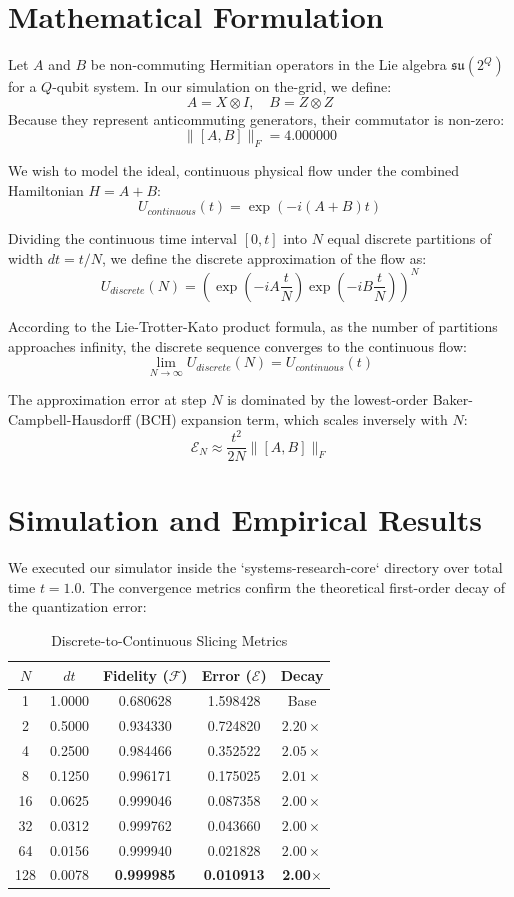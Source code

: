 \documentclass[11pt,twocolumn]{article}
\begin{document}
\section{Mathematical Formulation}
Let $A$ and $B$ be non-commuting Hermitian operators in the Lie algebra $\mathfrak{su}(2^Q)$ for a $Q$-qubit system. In our simulation on the-grid, we define:
$$A = X \otimes I, \quad B = Z \otimes Z$$
Because they represent anticommuting generators, their commutator is non-zero:
$$\|[A, B]\|_F = 4.000000$$

We wish to model the ideal, continuous physical flow under the combined Hamiltonian $H = A + B$:
$$U_{continuous}(t) = \exp\left( -i (A + B) t \right)$$

Dividing the continuous time interval $[0, t]$ into $N$ equal discrete partitions of width $dt = t/N$, we define the discrete approximation of the flow as:
$$U_{discrete}(N) = \left( \exp\left(-i A \frac{t}{N}\right) \exp\left(-i B \frac{t}{N}\right) \right)^N$$

According to the Lie-Trotter-Kato product formula, as the number of partitions approaches infinity, the discrete sequence converges to the continuous flow:
$$\lim_{N \to \infty} U_{discrete}(N) = U_{continuous}(t)$$

The approximation error at step $N$ is dominated by the lowest-order Baker-Campbell-Hausdorff (BCH) expansion term, which scales inversely with $N$:
$$\mathcal{E}_N \approx \frac{t^2}{2N} \| [A, B] \|_F$$

\section{Simulation and Empirical Results}
We executed our simulator inside the `systems-research-core` directory over total time $t = 1.0$. The convergence metrics confirm the theoretical first-order decay of the quantization error:

\begin{table}[h]
\centering
\begin{tabular}{ccccc}
\toprule
$N$ & $dt$ & Fidelity ($\mathcal{F}$) & Error ($\mathcal{E}$) & Decay \\
\midrule
1 & 1.0000 & 0.680628 & 1.598428 & Base \\
2 & 0.5000 & 0.934330 & 0.724820 & $2.20\times$ \\
4 & 0.2500 & 0.984466 & 0.352522 & $2.05\times$ \\
8 & 0.1250 & 0.996171 & 0.175025 & $2.01\times$ \\
16 & 0.0625 & 0.999046 & 0.087358 & $2.00\times$ \\
32 & 0.0312 & 0.999762 & 0.043660 & $2.00\times$ \\
64 & 0.0156 & 0.999940 & 0.021828 & $2.00\times$ \\
128 & 0.0078 & \textbf{0.999985} & \textbf{0.010913} & \textbf{2.00$\times$} \\
\bottomrule
\end{tabular}
\caption{Discrete-to-Continuous Slicing Metrics}
\label{tab:metrics}
\end{table}
\end{document}
